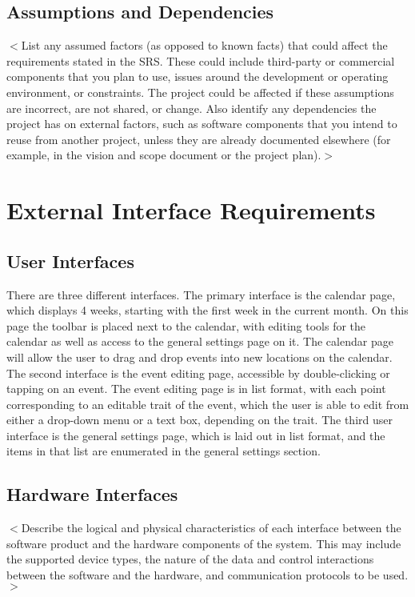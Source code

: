 \documentclass{scrreprt}
\begin{document}
\section{Assumptions and Dependencies}

$<$List any assumed factors (as opposed to known facts) that could affect the
requirements stated in the SRS. These could include third-party or commercial
components that you plan to use, issues around the development or operating
environment, or constraints. The project could be affected if these assumptions
are incorrect, are not shared, or change. Also identify any dependencies the
project has on external factors, such as software components that you intend to
reuse from another project, unless they are already documented elsewhere (for
example, in the vision and scope document or the project plan).$>$


\chapter{External Interface Requirements}

\section{User Interfaces}
There are three different interfaces. The primary interface is the calendar page, which displays 4 weeks, starting with the first week in the current month. On this page the toolbar is placed next to the calendar, with editing tools for the calendar as well as access to the general settings page on it. The calendar page will allow the user to drag and drop events into new locations on the calendar. The second interface is the event editing page, accessible by double-clicking or tapping on an event. The event editing page is in list format, with each point corresponding to an editable trait of the event, which the user is able to edit from either a drop-down menu or a text box, depending on the trait. The third user interface is the general settings page, which is laid out in list format, and the items in that list are enumerated in the general settings section.



\section{Hardware Interfaces}
$<$Describe the logical and physical characteristics of each interface between
the software product and the hardware components of the system. This may include
the supported device types, the nature of the data and control interactions
between the software and the hardware, and communication protocols to be
used.$>$
\end{document}
